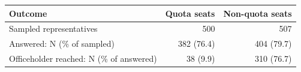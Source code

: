 
\begin{tabular}[t]{lrr}
\toprule
Outcome & Quota seats & Non-quota seats\\
\midrule
Sampled representatives & 500 & 507\\
Answered: N (\% of sampled) & 382 (76.4) & 404 (79.7)\\
Officeholder reached: N (\% of answered) & 38 (9.9) & 310 (76.7)\\
\bottomrule
\end{tabular}
